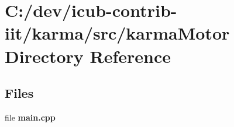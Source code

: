 \section{C\+:/dev/icub-\/contrib-\/iit/karma/src/karma\+Motor Directory Reference}
\label{dir_a61e44ac46e7253a0943cfd762c184f9}
\subsection*{Files}
\begin{DoxyCompactItemize}
\item 
file {\bfseries main.\+cpp}
\end{DoxyCompactItemize}
